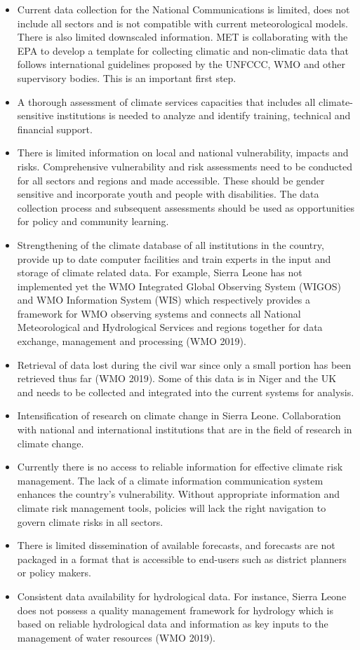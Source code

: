 \documentclass[
]{book}
\begin{document}
\begin{itemize}
\item
  Current data collection for the National Communications is limited, does not include all sectors and is not compatible with current meteorological models. There is also limited downscaled information. MET is collaborating with the EPA to develop a template for collecting climatic and non-climatic data that follows international guidelines proposed by the UNFCCC, WMO and other supervisory bodies. This is an important first step.
\item
  A thorough assessment of climate services capacities that includes all climate-sensitive institutions is needed to analyze and identify training, technical and financial support.
\item
  There is limited information on local and national vulnerability, impacts and risks. Comprehensive vulnerability and risk assessments need to be conducted for all sectors and regions and made accessible. These should be gender sensitive and incorporate youth and people with disabilities. The data collection process and subsequent assessments should be used as opportunities for policy and community learning.
\item
  Strengthening of the climate database of all institutions in the country, provide up to date computer facilities and train experts in the input and storage of climate related data. For example, Sierra Leone has not implemented yet the WMO Integrated Global Observing System (WIGOS) and WMO Information System (WIS) which respectively provides a framework for WMO observing systems and connects all National Meteorological and Hydrological Services and regions together for data exchange, management and processing (WMO 2019).
\item
  Retrieval of data lost during the civil war since only a small portion has been retrieved thus far (WMO 2019). Some of this data is in Niger and the UK and needs to be collected and integrated into the current systems for analysis.
\item
  Intensification of research on climate change in Sierra Leone. Collaboration with national and international institutions that are in the field of research in climate change.
\item
  Currently there is no access to reliable information for effective climate risk management. The lack of a climate information communication system enhances the country's vulnerability. Without appropriate information and climate risk management tools, policies will lack the right navigation to govern climate risks in all sectors.
\item
  There is limited dissemination of available forecasts, and forecasts are not packaged in a format that is accessible to end-users such as district planners or policy makers.
\item
  Consistent data availability for hydrological data. For instance, Sierra Leone does not possess a quality management framework for hydrology which is based on reliable hydrological data and information as key inputs to the management of water resources (WMO 2019).
\end{itemize}
\end{document}
